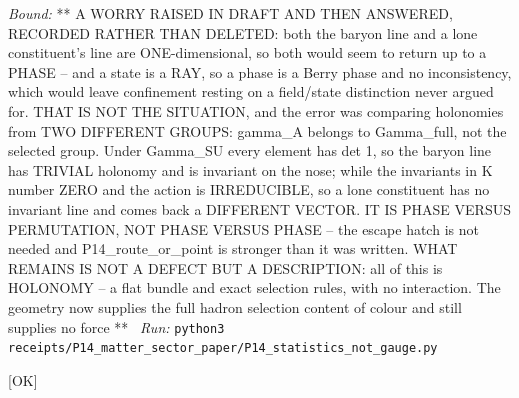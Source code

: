\begin{description}
 \emph{Bound:} ** A WORRY RAISED IN DRAFT AND THEN ANSWERED, RECORDED RATHER THAN DELETED: both the baryon line and a lone constituent's line are ONE-dimensional, so both would seem to return up to a PHASE -- and a state is a RAY, so a phase is a Berry phase and no inconsistency, which would leave confinement resting on a field/state distinction never argued for. THAT IS NOT THE SITUATION, and the error was comparing holonomies from TWO DIFFERENT GROUPS: gamma\_A belongs to Gamma\_full, not the selected group. Under Gamma\_SU every element has det 1, so the baryon line has TRIVIAL holonomy and is invariant on the nose; while the invariants in K number ZERO and the action is IRREDUCIBLE, so a lone constituent has no invariant line and comes back a DIFFERENT VECTOR. IT IS PHASE VERSUS PERMUTATION, NOT PHASE VERSUS PHASE -- the escape hatch is not needed and P14\_route\_or\_point is stronger than it was written. WHAT REMAINS IS NOT A DEFECT BUT A DESCRIPTION: all of this is HOLONOMY -- a flat bundle and exact selection rules, with no interaction. The geometry now supplies the full hadron selection content of colour and still supplies no force **
\ \emph{Run:} \texttt{python3 receipts/P14\_matter\_sector\_paper/P14\_statistics\_not\_gauge.py}
\item[\label{rcpt:P14_two_rank_threes}\texttt{P14\_two\_rank\_threes}]\hfill\textsf{[OK]}\\

\end{description}
